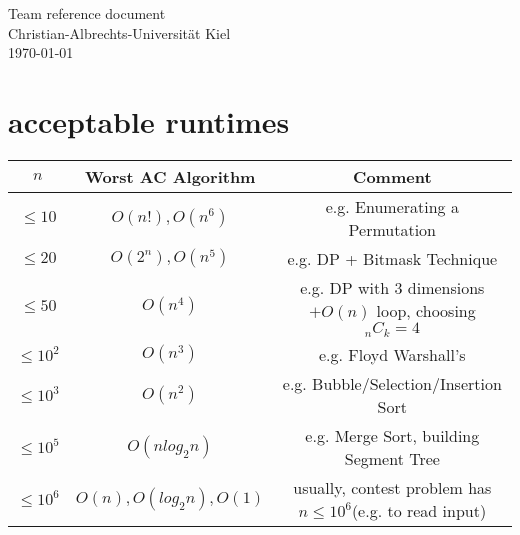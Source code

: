 \documentclass{article}
\begin{document}
\begin{titlepage}
  \centering
  \large
  \vspace*{\fill}
  \vspace{0.5\baselineskip}
  Team reference document\\
  \vspace{2.5\baselineskip}
  Christian-Albrechts-Universität Kiel \\
  \vspace{2\baselineskip}
  \today \\
  \vspace*{\fill}
\end{titlepage}
      
\begin{multicols*}{2}
  
  
  
  
    
\end{multicols*}

\section{acceptable runtimes}
\begin{table*}[h]
	\centering
	\begin{tabular}[t]{c c c}
		\hline
		$n$ & Worst AC Algorithm & Comment\\ [0.5ex]
		\hline
		\hline
		$\leq 10$ & $O(n!), O(n^6)$ & e.g. Enumerating a Permutation\\
		\hline
		$\leq 20$ & $O(2^n), O(n^5)$ & e.g. DP + Bitmask Technique\\
		\hline
		$\leq 50$ & $O(n^4)$ & e.g. DP with $3$ dimensions $+O(n)$ loop, choosing $_nC_k=4$\\
		\hline
		$\leq 10^2$ & $O(n^3)$ & e.g. Floyd Warshall’s\\
		\hline
		$\leq 10^3$ & $O(n^2)$ & e.g. Bubble/Selection/Insertion Sort\\
		\hline
		$\leq 10^5$ & $O(n log_2 n)$ & e.g. Merge Sort, building Segment Tree\\
		\hline
		$\leq 10^6$ & $O(n),O(log_2n),O(1)$ & usually, contest problem has $n\leq 10^6$(e.g. to read input)\\
		\hline
	\end{tabular}
\end{table*}
\end{document}
